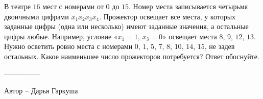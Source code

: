 \question
В театре $16$ мест с номерами от $0$ до $15$. Номер места записывается четырьмя двоичными цифрами $x_1x_2x_3x_4$. Прожектор освещает все места, у которых заданные цифры (одна или несколько) имеют заданные значения, а остальные цифры любые. Например, условие «$x_1=1$, $x_3=0$» освещает места $8$, $9$, $12$, $13$. Нужно осветить ровно места с номерами $0$, $1$, $5$, $7$, $8$, $10$, $14$, $15$, не задев остальных. Какое наименьшее число прожекторов потребуется? Ответ обоснуйте.

---------------

Автор -- Дарья Гаркуша